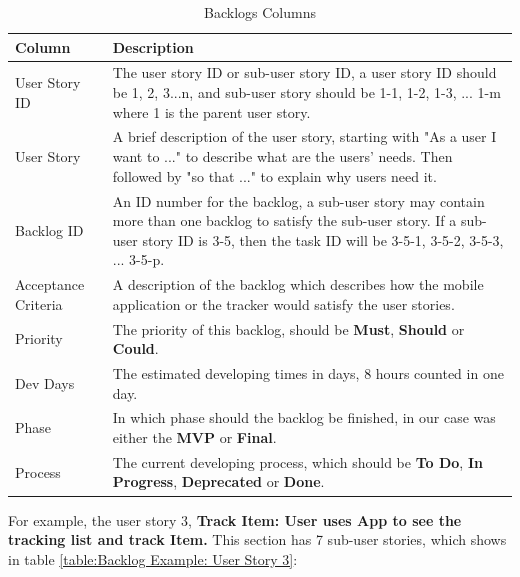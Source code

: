 \documentclass[12pt,a4paper]{article}
\begin{document}
          \begin{table}[H]
            \centering
              \begin{tabularx}{\textwidth}{l X}
                \hline
                Column & Description  \\ \hline
                User Story ID & The user story ID or sub-user story ID, a user story ID should be 1, 2, 3...n, and sub-user story should be 1-1, 1-2, 1-3, ... 1-m  where 1 is the parent user story.\\ 
                User Story & A brief description of the user story, starting with "As a user I want to ..." to describe what are the users' needs. Then followed by "so that ..." to explain why users need it. \\ 
                Backlog ID & An ID number for the backlog, a sub-user story may contain more than one backlog to satisfy the sub-user story. If a sub-user story ID is  3-5, then the task ID will be 3-5-1, 3-5-2, 3-5-3, ... 3-5-p.  \\ 
                Acceptance Criteria & A description of the backlog which describes how the mobile application or the tracker would satisfy the user stories. \\ 
                Priority & The priority of this backlog, should be {\bf Must}, {\bf Should} or {\bf Could}. \\                  
                Dev Days & The estimated developing times in days, 8 hours counted in one day. \\                  
                Phase & In which phase should the backlog be finished, in our case was either the {\bf MVP} or {\bf Final}. \\                  
                Process & The current developing process, which should be {\bf To Do}, {\bf In Progress}, {\bf Deprecated} or {\bf Done}.  \\                  
                \hline
              \end{tabularx}
              \caption[Table caption text]{Backlogs Columns}
              \label{table:Backlogs Column}
          \end{table}
          
          For example, the user story 3, {\bf Track Item: User uses App to see the tracking list and track Item.} This section has 7 sub-user stories, which shows in table \ref{table:Backlog Example: User Story 3}: 
          
\end{document}
